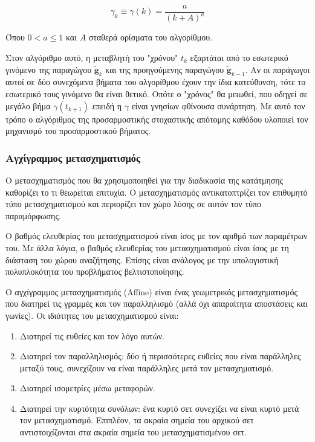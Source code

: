 \documentclass[a4paper,12pt]{article}
\begin{document}
\begin{equation*}
    \gamma_k \equiv \gamma(k) = \frac {a} {(k+A)^a}
\end{equation*}

Όπου $0 < a \leq 1$ και $A$ σταθερά ορίσματα του αλγορίθμου.

Στον αλγόριθμο αυτό, η μεταβλητή του "χρόνου" $t_k$ εξαρτάται από το εσωτερικό
γινόμενο της παραγώγου $\widetilde{\bm{g}}_{k}$ και της προηγούμενης παραγώγου
$\widetilde{\bm{g}}_{k-1}$. Αν οι παράγωγοι αυτοί σε δύο συνεχόμενα βήματα του
αλγορίθμου έχουν την ίδια κατεύθυνση, τότε  το εσωτερικό τους γινόμενο θα είναι
θετικό. Οπότε ο "χρόνος" θα μειωθεί, που οδηγεί σε μεγάλο βήμα
$\gamma(t_{k+1})$ επειδή η $\gamma$ είναι γνησίων φθίνουσα συνάρτηση. Με αυτό
τον τρόπο ο αλγόριθμος της προσαρμοστικής στοχαστικής απότομης καθόδου υλοποιεί
τον μηχανισμό του προσαρμοστικού βήματος.

\subsubsection{Αγχίγραμμος μετασχηματισμός} \label{reg:affine:1}

Ο μετασχηματισμός που θα χρησιμοποιηθεί για την διαδικασία της κατάτμησης
καθορίζει το τι θεωρείται επιτυχία. Ο μετασχηματισμός αντικατοπτρίζει τον
επιθυμητό τύπο μετασχηματισμού και περιορίζει τον χώρο λύσης σε αυτόν τον τύπο
παραμόρφωσης.

Ο βαθμός ελευθερίας του μετασχηματισμού είναι ίσος με τον αριθμό των παραμέτρων
του. Με άλλα λόγια, ο βαθμός ελευθερίας του μετασχηματισμού είναι ίσος με τη
διάσταση του χώρου αναζήτησης. Επίσης είναι ανάλογος με την υπολογιστική
πολυπλοκότητα του προβλήματος βελτιστοποίησης.

Ο αγχίγραμμος μετασχηματισμός (Affine) είναι ένας γεωμετρικός μετασχηματισμός
που διατηρεί τις γραμμές και τον παραλληλισμό (αλλά όχι απαραίτητα αποστάσεις
και γωνίες). Οι ιδιότητες του μετασχηματισμού είναι:

\begin{enumerate}
    \item Διατηρεί τις ευθείες και τον λόγο αυτών.
    \item Διατηρεί τον παραλληλισμός: δύο ή περισσότερες ευθείες που είναι
        παράλληλες μεταξύ τους, συνεχίζουν να είναι παράλληλες μετά τον
        μετασχηματισμό.
    \item Διατηρεί ισομετρίες μέσω μεταφορών. 
    \item Διατηρεί την κυρτότητα συνόλων: ένα κυρτό σετ συνεχίζει να είναι κυρτό
        μετά τον μετασχηματισμό. Επιπλέον, τα ακραία σημεία του αρχικού σετ
        αντιστοιχίζονται στα ακραία σημεία του μετασχηματισμένου σετ.
\end{enumerate}
\end{document}

